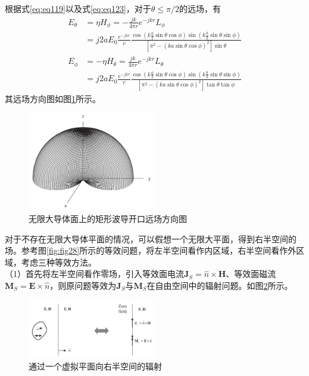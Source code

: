 \documentclass{article}
\numberwithin{equation}{section}
\begin{document}
根据式\ref{eq:eq119}以及式\ref{eq:eq123}，对于$\theta\leq\pi/2$的远场，有
\begin{align}
    \label{eq:eq254}
    E_{\theta}&=\eta H_{\phi}=-\frac{jk}{4\pi r}e^{-jkr}L_{\phi} \nonumber \\
              &=j2aE_0\frac{e^{-jkr}}{r}\frac{\cos\left(k\frac{a}{2}\sin\theta\cos\phi\right)\sin\left(k\frac{b}{2}\sin\theta\sin\phi\right)}{[\pi^2-(ka\sin\theta\cos\phi)^2]\sin\theta} \\
    \label{eq:eq255}
    E_{\phi}&=-\eta H_{\theta}=\frac{jk}{4\pi r}e^{-jkr}L_{\theta} \nonumber \\
            &=j2aE_0\frac{e^{-jkr}}{r}\frac{\cos\left(k\frac{a}{2}\sin\theta\cos\phi\right)\sin\left(k\frac{b}{2}\sin\theta\sin\phi\right)}{[\pi^2-(ka\sin\theta\cos\phi)^2]\tan\theta\tan\phi}
\end{align}
其远场方向图如图\ref{fig:fig27}所示。
\begin{figure}[ht]
    \centering
    \includegraphics[width=0.5\textwidth]{无限大导体面上的矩形波导开口远场方向图.PNG}
    \caption{无限大导体面上的矩形波导开口远场方向图}
    \label{fig:fig27}
\end{figure}
\par
对于不存在无限大导体平面的情况，可以假想一个无限大平面，得到右半空间的场。参考图\ref{fig:fig28}所示的等效问题，将左半空间看作内区域，右半空间看作外区域，考虑三种等效方法。\\
（1）首先将左半空间看作零场，引入等效面电流$\mathbf{J}_S=\hat{n}\times\mathbf{H}$、等效面磁流$\mathbf{M}_S=\mathbf{E}\times\hat{n}$，则原问题等效为$\mathbf{J}_S$与$\mathbf{M}_S$在自由空间中的辐射问题。如图\ref{fig:fig29}所示。
\begin{figure}[ht]
    \centering
    \includegraphics[width=0.5\textwidth]{通过一个虚拟平面向右半空间的辐射.PNG}
    \caption{通过一个虚拟平面向右半空间的辐射}
    \label{fig:fig29}
\end{figure}
\end{document}
